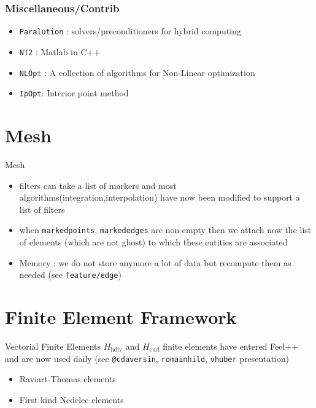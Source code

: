 \begin{frame}
  \frametitle{Miscellaneous/Contrib}
  \begin{itemize}
  \item \texttt{Paralution} : solvers/preconditioners for hybrid computing
  \item \texttt{NT2} : Matlab in C++
  \item \texttt{NLOpt} : A collection of algorithms for Non-Linear optimization
  \item \texttt{IpOpt}: Interior point method
  \end{itemize}
\end{frame}

\section{Mesh }

\begin{frame}[fragile]{Mesh}
  \begin{itemize}
  \item filters can take a list of markers and most
    algorithms(integration,interpolation) have now been modified to
    support a list of filters
  \item when \texttt{markedpoints},
    \texttt{markededges} are non-empty then we attach now
    the list of elements (which are not ghost) to which these entities
    are associated
  \item Memory : we do not store anymore a lot of data but recompute
    them as needed (see \verb+feature/edge+)
  \end{itemize}
\end{frame}

\section{Finite Element Framework}

\begin{frame}[fragile]{Vectorial Finite Elements}
  $H_{\mathrm{hdiv}}$ and $H_{\mathrm{curl}}$ finite elements have
  entered Feel++ and are now used daily (see \verb+@cdaversin+,
  \verb+romainhild+, \verb+vhuber+
  presentation)
  \begin{itemize}
  \item Raviart-Thomas elements
  \item First kind Nedelec elements
  \end{itemize}
\end{frame}

